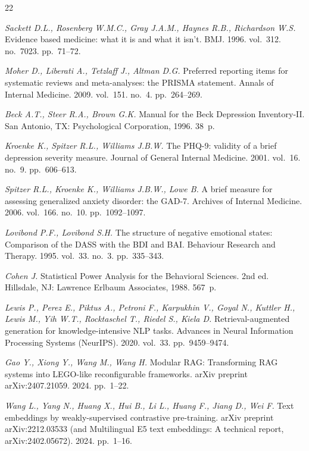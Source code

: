 \documentclass[10pt]{SPIIRAS_Proceedings}
\begin{document}
\begin{thebibliography}{22}

\emph{Sackett D.L., Rosenberg W.M.C., Gray J.A.M., Haynes R.B., Richardson W.S.} Evidence based medicine: what it is and what it isn't. BMJ. 1996. vol.~312. no.~7023. pp.~71--72.

\emph{Moher D., Liberati A., Tetzlaff J., Altman D.G.} Preferred reporting items for systematic reviews and meta-analyses: the PRISMA statement. Annals of Internal Medicine. 2009. vol.~151. no.~4. pp.~264--269.

\emph{Beck A.T., Steer R.A., Brown G.K.} Manual for the Beck Depression Inventory-II. San Antonio, TX: Psychological Corporation, 1996. 38~p.

\emph{Kroenke K., Spitzer R.L., Williams J.B.W.} The PHQ-9: validity of a brief depression severity measure. Journal of General Internal Medicine. 2001. vol.~16. no.~9. pp.~606--613.

\emph{Spitzer R.L., Kroenke K., Williams J.B.W., Lowe B.} A brief measure for assessing generalized anxiety disorder: the GAD-7. Archives of Internal Medicine. 2006. vol.~166. no.~10. pp.~1092--1097.

\emph{Lovibond P.F., Lovibond S.H.} The structure of negative emotional states: Comparison of the DASS with the BDI and BAI. Behaviour Research and Therapy. 1995. vol.~33. no.~3. pp.~335--343.

\emph{Cohen J.} Statistical Power Analysis for the Behavioral Sciences. 2nd ed. Hillsdale, NJ: Lawrence Erlbaum Associates, 1988. 567~p.

\emph{Lewis P., Perez E., Piktus A., Petroni F., Karpukhin V., Goyal N., Kuttler H., Lewis M., Yih W.T., Rocktaschel T., Riedel S., Kiela D.} Retrieval-augmented generation for knowledge-intensive NLP tasks. Advances in Neural Information Processing Systems (NeurIPS). 2020. vol.~33. pp.~9459--9474.

\emph{Gao Y., Xiong Y., Wang M., Wang H.} Modular RAG: Transforming RAG systems into LEGO-like reconfigurable frameworks. arXiv preprint arXiv:2407.21059. 2024. pp.~1--22.

\emph{Wang L., Yang N., Huang X., Hui B., Li L., Huang F., Jiang D., Wei F.} Text embeddings by weakly-supervised contrastive pre-training. arXiv preprint arXiv:2212.03533 (and Multilingual E5 text embeddings: A technical report, arXiv:2402.05672). 2024. pp.~1--16.


\end{thebibliography}
\end{document}
